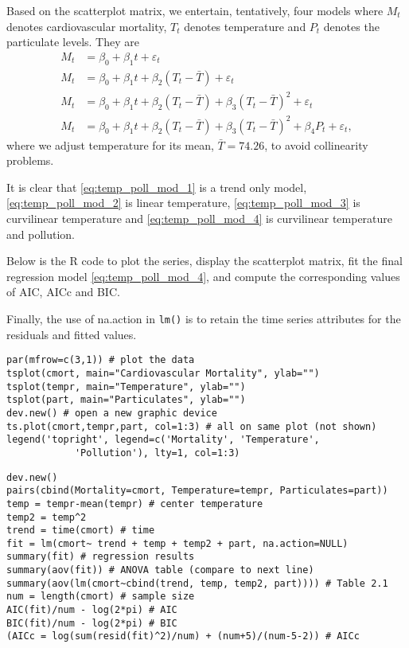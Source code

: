 \documentclass[
paper=128mm:96mm, %
fontsize=9.5pt, %
pagesize, %
parskip=half-, %
]{scrartcl} %
\theoremstyle{mythmstyle} %
\begin{document}
Based on the scatterplot matrix, we entertain, tentatively, four models where $M_t$ denotes cardiovascular mortality, $T_t$ denotes temperature and $P_t$ denotes the particulate levels. They are
%
\begin{align}
\label{eq:temp_poll_mod_1}
M_t&=\beta_0+\beta_1 t+\varepsilon_t\\
\label{eq:temp_poll_mod_2}
M_t&=\beta_0+\beta_1 t+\beta_2\left(T_t-\bar{T}\right)+\varepsilon_t\\
\label{eq:temp_poll_mod_3}
M_t&=\beta_0+\beta_1 t+\beta_2\left(T_t-\bar{T}\right)+\beta_3\left(T_t-\bar{T}\right)^2+\varepsilon_t\\
\label{eq:temp_poll_mod_4}
M_t&=\beta_0+\beta_1 t+\beta_2\left(T_t-\bar{T}\right)+\beta_3\left(T_t-\bar{T}\right)^2+\beta_4P_t+\varepsilon_t,
\end{align}
where we adjust temperature for its mean, $\bar{T}= 74.26$, to avoid collinearity problems.

It is clear that \eqref{eq:temp_poll_mod_1} is a trend only model, \eqref{eq:temp_poll_mod_2} is linear temperature, \eqref{eq:temp_poll_mod_3} is curvilinear temperature and \eqref{eq:temp_poll_mod_4} is curvilinear temperature and pollution. 
\clearpage

Below is the R code to plot the series, display the scatterplot matrix, fit the final regression model \eqref{eq:temp_poll_mod_4}, and compute the corresponding values of AIC, AICc and BIC. 

Finally, the use of na.action in \texttt{lm()} is to retain the time series attributes for the residuals and fitted values.
%
\begin{lstlisting}[belowskip=-0.8 \baselineskip]
par(mfrow=c(3,1)) # plot the data
tsplot(cmort, main="Cardiovascular Mortality", ylab="") 
tsplot(tempr, main="Temperature", ylab="")
tsplot(part, main="Particulates", ylab="")
dev.new() # open a new graphic device 
ts.plot(cmort,tempr,part, col=1:3) # all on same plot (not shown) 
legend('topright', legend=c('Mortality', 'Temperature', 
			'Pollution'), lty=1, col=1:3)
\end{lstlisting}
%
\clearpage

%
\begin{lstlisting}[belowskip=-0.8 \baselineskip]
dev.new()
pairs(cbind(Mortality=cmort, Temperature=tempr, Particulates=part)) 
temp = tempr-mean(tempr) # center temperature
temp2 = temp^2
trend = time(cmort) # time
fit = lm(cmort~ trend + temp + temp2 + part, na.action=NULL) summary(fit) # regression results
summary(aov(fit)) # ANOVA table (compare to next line) 
summary(aov(lm(cmort~cbind(trend, temp, temp2, part)))) # Table 2.1 
num = length(cmort) # sample size
AIC(fit)/num - log(2*pi) # AIC
BIC(fit)/num - log(2*pi) # BIC
(AICc = log(sum(resid(fit)^2)/num) + (num+5)/(num-5-2)) # AICc
\end{lstlisting}
\end{document}

